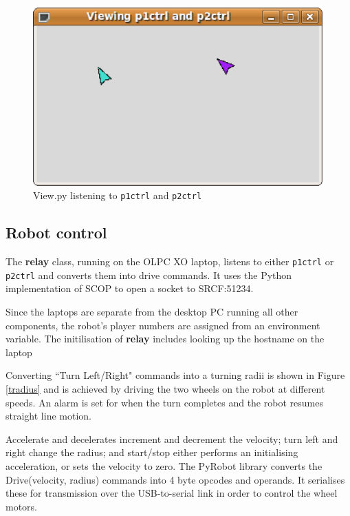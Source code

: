 \documentclass[12pt,a4,notitlepage]{report}
\renewcommand{\_}{\texttt{\symbol{95}}}
\newcommand{\<}{\texttt{\symbol{60}}}
\renewcommand{\>}{\texttt{\symbol{62}}}
\newcommand{\class}[1]{\textbf{#1}}
\newcommand{\scopendpoint}[1]{\texttt{#1}}
\begin{document}
\begin{itemize}
\begin{figure}[hb]
\centering
\includegraphics[scale=0.5,angle=0]{images/View.ps}
\caption{View.py listening to \scopendpoint{p1ctrl} and \scopendpoint{p2ctrl}}
\label{control}
\end{figure}

\end{itemize}

\subsection{Robot control}

The \class{relay} class, running on the OLPC XO laptop, listens to either \scopendpoint{p1ctrl} or \scopendpoint{p2ctrl} and converts them into drive commands. It uses the Python implementation of SCOP to open a socket to SRCF:51234. 

Since the laptops are separate from the desktop PC running all other components, the robot's player numbers are assigned from an environment variable. The initilisation of \class{relay} includes looking up the hostname on the laptop

Converting ``Turn Left/Right" commands into a turning radii is shown in Figure \ref{tradius} and is achieved by driving the two wheels on the robot at different speeds. An alarm is set for when the turn completes and the robot resumes straight line motion.

Accelerate and decelerates increment and decrement the velocity; turn left and right change the radius; and start/stop either performs an initialising acceleration, or sets the velocity to zero. The PyRobot library converts the Drive(velocity, radius) commands into 4 byte opcodes and operands. It serialises these for transmission over the USB-to-serial link in order to control the wheel motors.
\end{document}
